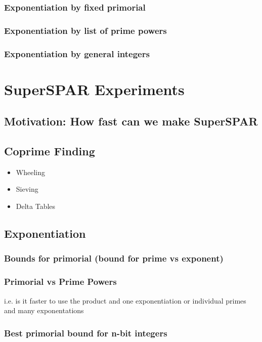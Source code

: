 \documentclass{ucalgthes1}
\theoremstyle{plain}
\theoremstyle{definition}
\begin{document}
\subsection{Exponentiation by fixed primorial}

\subsection{Exponentiation by list of prime powers}

\subsection{Exponentiation by general integers}

\chapter{SuperSPAR Experiments}

\section{Motivation: How fast can we make SuperSPAR}

\section{Coprime Finding}
\begin{itemize}
\item Wheeling
\item Sieving
\item Delta Tables
\end{itemize}

\section{Exponentiation}
\subsection{Bounds for primorial (bound for prime vs exponent)}
\subsection{Primorial vs Prime Powers}
i.e. is it faster to use the product and one exponentiation or individual primes and many exponentations
\subsection{Best primorial bound for n-bit integers}
\end{document}
